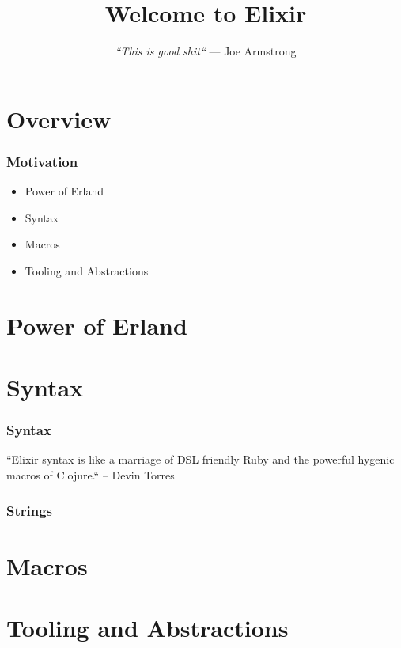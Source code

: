 \documentclass{beamer}
\begin{document}
\title{Welcome to Elixir}
\subtitle{
  \textit{
    \linebreak
    ``This is good shit``
    \linebreak
  }
  \tiny{\textrm{--- Joe Armstrong}}
}
\frame{\titlepage}


\section[Section]{Overview}

\begin{frame}
  \frametitle{Motivation}
  \begin{itemize}
  \item Power of Erland
  \item Syntax
  \item Macros
  \item Tooling and Abstractions
  \end{itemize}
\end{frame}

\section[Section]{Power of Erland}

\section[Section]{Syntax}

\begin{frame}
  \frametitle{Syntax}
  ``Elixir syntax is like a marriage of DSL
  friendly Ruby and the powerful hygenic macros of Clojure.``
  \linebreak
  \textrm{-- Devin Torres}
\end{frame}

\begin{frame}
  \frametitle{Strings}
\end{frame}

\section[Section]{Macros}

\section[Section]{Tooling and Abstractions}
  
\end{document}
